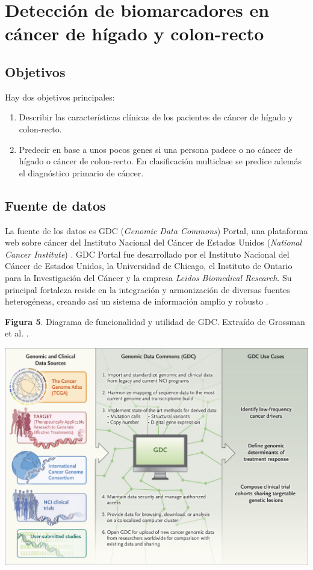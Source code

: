 \chapter{Detección de biomarcadores en cáncer de hígado y colon-recto}

\section{Objetivos}

Hay dos objetivos principales:
\begin{enumerate}
	\item Describir las características clínicas de los pacientes de cáncer de hígado y colon-recto.
	\item Predecir en base a unos pocos genes si una persona padece o no cáncer de hígado o cáncer de colon-recto. En clasificación multiclase se predice además el diagnóstico primario de cáncer.
\end{enumerate}

\section{Fuente de datos}

La fuente de los datos es GDC (\textit{Genomic Data Commons}) Portal, una plataforma web sobre cáncer del Instituto Nacional del Cáncer de Estados Unidos (\textit{National Cancer Institute}) \cite{GDCPortal, NationalCancerInstitute}. GDC Portal fue desarrollado por el Instituto Nacional del Cáncer de Estados Unidos, la Universidad de Chicago, el Instituto de Ontario para la Investigación del Cáncer y la empresa \textit{Leidos Biomedical Research}. Su principal fortaleza reside en la integración y armonización de diversas fuentes heterogéneas, creando así un sistema de información amplio y robusto \cite{Grossman2016}. \\

\newpage
\begin{center}
	\textbf{Figura 5}. Diagrama de funcionalidad y utilidad de GDC. Extraído de Grossman et al. \cite{Grossman2016}.
\end{center}
\begin{center}
	\includegraphics[width=1\textwidth]{figuras/05_funcionamiento_gdc.jpeg} 
\end{center}

